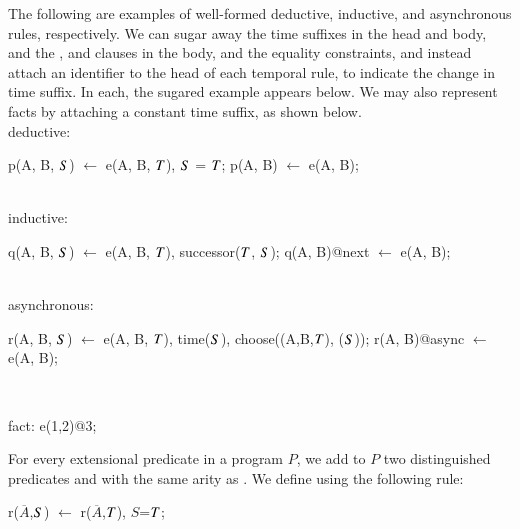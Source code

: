 \begin{example}
The following are examples of well-formed deductive, inductive, and asynchronous rules, respectively.
We can sugar away the time suffixes in the head and body, and the
,  and  clauses in
the body, and the equality constraints, and instead attach an identifier to the head of each
temporal rule, to indicate the change in time suffix.  In each, the sugared example appears
below.  We may also represent facts by attaching a constant time suffix, as shown below.
\\
deductive:
\begin{Dedalus}
p(A, B, \(\DS\)) \(\leftarrow\) e(A, B, \(\DT\)), \(\DS\) = \(\DT\);
p(A, B) \(\leftarrow\) e(A, B);
\end{Dedalus}
\\
inductive:
\begin{Dedalus}
q(A, B, \(\DS\)) \(\leftarrow\) e(A, B, \(\DT\)), successor(\(\DT\), \(\DS\));
q(A, B)@next \(\leftarrow\) e(A, B);
\end{Dedalus}
\\
asynchronous:
\begin{Dedalus}
r(A, B, \(\DS\)) \(\leftarrow\) e(A, B, \(\DT\)), time(\(\DS\)),
   choose((A,B,\(\DT\)), (\(\DS\)));
r(A, B)@async \(\leftarrow\) e(A, B);
\end{Dedalus}
\\
\begin{Dedalus}
fact:
e(1,2)@3;
\end{Dedalus}
\end{example}


For every extensional predicate  in a \lang program $P$, we add to
$P$ two distinguished predicates  and  with the same arity
as .  We define  using the following rule:

\begin{dedalus}
r\pos($\overline{A}$,\(\DS\)) \(\leftarrow\) r($\overline{A}$,\(\DT\)), \(S\)=\(\DT\);
\end{dedalus}

   
